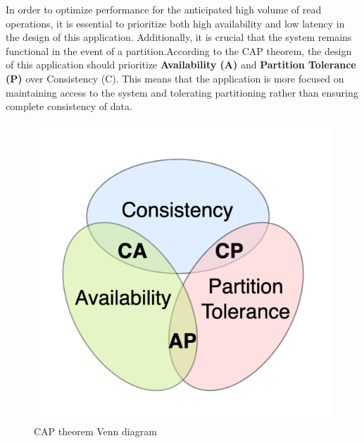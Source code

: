 In order to optimize performance for the anticipated high volume of read operations, it is essential to prioritize both high availability and low latency in the design of this application. Additionally, it is crucial that the system remains functional in the event of a partition.According to the CAP theorem, the design of this application should prioritize \textbf{Availability (A)} and \textbf{Partition Tolerance (P)} over Consistency (C). This means that the application is more focused on maintaining access to the system and tolerating partitioning rather than ensuring complete consistency of data.
\begin{figure}[H]
	\centering
	\includegraphics[width=0.4\linewidth]{assets/CAP_Theorem_Venn_Diagram}
	\caption{CAP theorem Venn diagram}
	\label{fig:captheoremvenndiagram}
\end{figure}






